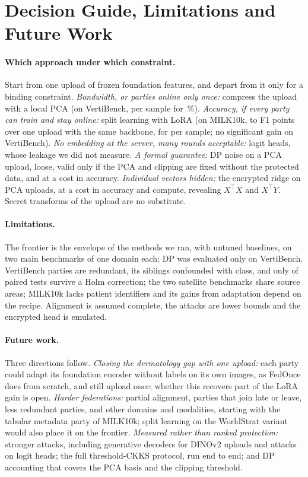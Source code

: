 \section{Decision Guide, Limitations and Future Work}\label{sec:discussion}

\paragraph{Which approach under which constraint.}
Start from one upload of frozen foundation features, and depart from it only for a binding constraint. \emph{Bandwidth, or parties online only once:} compress the upload with a local PCA (on VertiBench, \selTwokBytes{} per sample for \selTwokAcc\,\%). \emph{Accuracy, if every party can train and stay online:} split learning with LoRA (on MILK10k, \fzGapViewsCb{} to \fzGapViewsB{} F1 points over one upload with the same backbone, for \fzUpdinovTwoblora{} per sample; no significant gain on VertiBench). \emph{No embedding at the server, many rounds acceptable:} logit heads, whose leakage we did not measure. \emph{A formal guarantee:} DP noise on a PCA upload, loose, valid only if the PCA and clipping are fixed without the protected data, and at a cost in accuracy. \emph{Individual vectors hidden:} the encrypted ridge on PCA uploads, at a cost in accuracy and compute, revealing $X^\top X$ and $X^\top Y$. Secret transforms of the upload are no substitute.

\paragraph{Limitations.}
The frontier is the envelope of the methods we ran, with untuned baselines, on two main benchmarks of one domain each; DP was evaluated only on VertiBench. VertiBench parties are redundant, its siblings confounded with class, and only \holmSurvive{} of \holmN{} paired tests survive a Holm correction; the two satellite benchmarks share source areas; MILK10k lacks patient identifiers and its gains from adaptation depend on the recipe. Alignment is assumed complete, the attacks are lower bounds and the encrypted head is emulated.

\paragraph{Future work.}
Three directions follow. \emph{Closing the dermatology gap with one upload:} each party could adapt its foundation encoder without labels on its own images, as FedOnce does from scratch, and still upload once; whether this recovers part of the LoRA gain is open. \emph{Harder federations:} partial alignment, parties that join late or leave, less redundant parties, and other domains and modalities, starting with the tabular metadata party of MILK10k; split learning on the WorldStrat variant would also place it on the frontier. \emph{Measured rather than ranked protection:} stronger attacks, including generative decoders for DINOv2 uploads and attacks on logit heads; the full threshold-CKKS protocol, run end to end; and DP accounting that covers the PCA basis and the clipping threshold.

